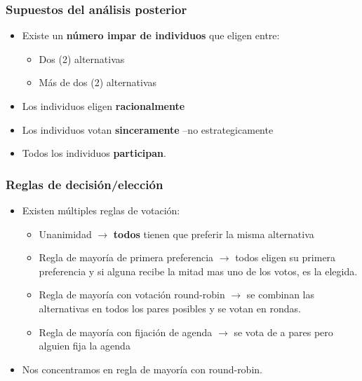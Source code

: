 \documentclass[14pt,aspectratio=169]{beamer}
\begin{document}
\begin{frame}\frametitle{Supuestos del análisis posterior}
  \begin{itemize}
  \item Existe un \textbf{número impar de individuos} que eligen
    entre:
    \begin{itemize}\itemsep 10pt \medskip
    \item Dos (2) alternativas
    \item Más de dos (2) alternativas
    \end{itemize}
  \item Los individuos eligen \textbf{racionalmente}
    \item Los individuos votan \textbf{sinceramente} --no
      estrategicamente
      \item Todos los individuos \textbf{participan}. 
    \end{itemize}
  \end{frame}

  \begin{frame}\frametitle{Reglas de decisión/elección}
    \begin{itemize}
    \item Existen múltiples reglas de votación:
      \begin{itemize}\itemsep 10pt \medskip
      \item Unanimidad $\longrightarrow$ \textbf{todos} tienen que
        preferir la misma alternativa
        \item Regla de mayoría de primera preferencia
          $\longrightarrow$ todos eligen su primera preferencia y si
          alguna recibe la mitad mas uno de los votos, es la elegida.
          \item Regla de mayoría con votación round-robin
            $\longrightarrow$ se combinan las alternativas en todos
            los pares posibles y se votan en rondas.
            \item Regla de mayoría con fijación de agenda
              $\longrightarrow$ se vota de a pares pero alguien fija
              la agenda
          \end{itemize}
          \item Nos concentramos en regla de mayoría con round-robin. 
      \end{itemize}
    \end{frame}
\end{document}

